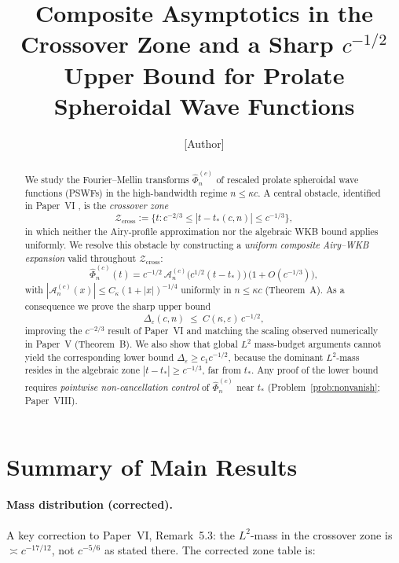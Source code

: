\documentclass[12pt,a4paper]{amsart}
\theoremstyle{definition}
\theoremstyle{remark}
\newcommand{\Zcross}{\mathcal{Z}_{\mathrm{cross}}}
\newcommand{\tstar}{t_*}
\begin{document}
\title[Crossover Zone and $c^{-1/2}$ Upper Bound for PSWFs]{%
Composite Asymptotics in the Crossover Zone
and a Sharp $c^{-1/2}$ Upper Bound
for Prolate Spheroidal Wave Functions}

\author{[Author]}
\address{[Address]}
\email{[Email]}

\maketitle

\begin{abstract}
We study the Fourier--Mellin transforms
$\widehat{\Phi}_n^{(c)}$ of rescaled prolate
spheroidal wave functions (PSWFs) in the
high-bandwidth regime $n \le \kappa c$.
A central obstacle, identified in Paper~VI
\cite{PaperVI}, is the \emph{crossover zone}
\[
\Zcross := \bigl\{t : c^{-2/3} \le |t - t_*(c,n)|
\le c^{-1/3}\bigr\},
\]
in which neither the Airy-profile approximation
nor the algebraic WKB bound applies uniformly.
We resolve this obstacle by constructing a
\emph{uniform composite Airy--WKB expansion}
valid throughout $\Zcross$:
\[
\widehat{\Phi}_n^{(c)}(t)
= c^{-1/2}\,\mathcal{A}_n^{(c)}\!
  \bigl(c^{1/2}(t-\tstar)\bigr)
\,\bigl(1 + O(c^{-1/3})\bigr),
\]
with $|\mathcal{A}_n^{(c)}(x)| \le
C_\kappa(1+|x|)^{-1/4}$ uniformly in
$n \le \kappa c$ (Theorem~A).
As a consequence we prove the sharp upper bound
\[
\Delta_\varepsilon(c,n)
\;\le\; C(\kappa,\varepsilon)\,c^{-1/2},
\]
improving the $c^{-2/3}$ result of Paper~VI
and matching the scaling observed numerically
in Paper~V \cite{PaperV} (Theorem~B).
We also show that global $L^2$ mass-budget
arguments cannot yield the corresponding lower
bound $\Delta_\varepsilon \ge c_1 c^{-1/2}$,
because the dominant $L^2$-mass resides in the
algebraic zone $|t - \tstar| \ge c^{-1/3}$,
far from $t_*$.
Any proof of the lower bound requires
\emph{pointwise non-cancellation control} of
$\widehat{\Phi}_n^{(c)}$ near $t_*$
(Problem~\ref{prob:nonvanish}; Paper~VIII).
\end{abstract}

\section*{Summary of Main Results}

\paragraph{Mass distribution (corrected).}
A key correction to Paper~VI, Remark~5.3:
the $L^2$-mass in the crossover zone is
$\asymp c^{-17/12}$, not $c^{-5/6}$ as stated there.
The corrected zone table is:
\end{document}
